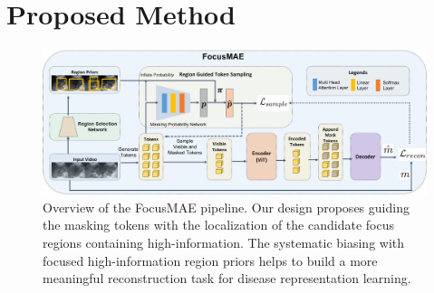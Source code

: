 \section{Proposed Method}
\begin{figure}[t]
    \centering
    \includegraphics[width=\textwidth]{figs/focusmae/arch.png}
    \caption[Overview of the FocusMAE pipeline]{Overview of the FocusMAE pipeline. Our design proposes guiding the masking tokens with the localization of the candidate focus regions containing high-information. The systematic biasing with focused high-information region priors helps to build a more meaningful reconstruction task for disease representation learning. }
    \label{focusmae_fig:arch}
\end{figure}

